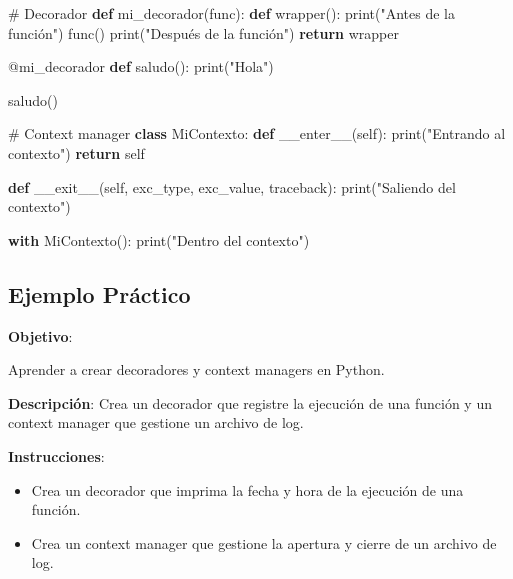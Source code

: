 \documentclass[
  a4paper,
  DIV=11,
  numbers=noendperiod,
  onepage,
  openany]{scrreprt}
\newenvironment{Shaded}{\begin{snugshade}}{\end{snugshade}}
\newcommand{\AttributeTok}[1]{\textcolor[rgb]{0.40,0.45,0.13}{#1}}
\newcommand{\BuiltInTok}[1]{\textcolor[rgb]{0.00,0.23,0.31}{#1}}
\newcommand{\CommentTok}[1]{\textcolor[rgb]{0.37,0.37,0.37}{#1}}
\newcommand{\ControlFlowTok}[1]{\textcolor[rgb]{0.00,0.23,0.31}{\textbf{#1}}}
\newcommand{\FunctionTok}[1]{\textcolor[rgb]{0.28,0.35,0.67}{#1}}
\newcommand{\KeywordTok}[1]{\textcolor[rgb]{0.00,0.23,0.31}{\textbf{#1}}}
\newcommand{\NormalTok}[1]{\textcolor[rgb]{0.00,0.23,0.31}{#1}}
\newcommand{\StringTok}[1]{\textcolor[rgb]{0.13,0.47,0.30}{#1}}
\newcommand{\VariableTok}[1]{\textcolor[rgb]{0.07,0.07,0.07}{#1}}
\begin{document}
\begin{Shaded}
\begin{Highlighting}[]
\CommentTok{\# Decorador}
\KeywordTok{def}\NormalTok{ mi\_decorador(func):}
    \KeywordTok{def}\NormalTok{ wrapper():}
        \BuiltInTok{print}\NormalTok{(}\StringTok{"Antes de la función"}\NormalTok{)}
\NormalTok{        func()}
        \BuiltInTok{print}\NormalTok{(}\StringTok{"Después de la función"}\NormalTok{)}
    \ControlFlowTok{return}\NormalTok{ wrapper}

\AttributeTok{@mi\_decorador}
\KeywordTok{def}\NormalTok{ saludo():}
    \BuiltInTok{print}\NormalTok{(}\StringTok{"Hola"}\NormalTok{)}

\NormalTok{saludo()}

\CommentTok{\# Context manager}
\KeywordTok{class}\NormalTok{ MiContexto:}
    \KeywordTok{def} \FunctionTok{\_\_enter\_\_}\NormalTok{(}\VariableTok{self}\NormalTok{):}
        \BuiltInTok{print}\NormalTok{(}\StringTok{"Entrando al contexto"}\NormalTok{)}
        \ControlFlowTok{return} \VariableTok{self}

    \KeywordTok{def} \FunctionTok{\_\_exit\_\_}\NormalTok{(}\VariableTok{self}\NormalTok{, exc\_type, exc\_value, traceback):}
        \BuiltInTok{print}\NormalTok{(}\StringTok{"Saliendo del contexto"}\NormalTok{)}

\ControlFlowTok{with}\NormalTok{ MiContexto():}
    \BuiltInTok{print}\NormalTok{(}\StringTok{"Dentro del contexto"}\NormalTok{)}
\end{Highlighting}
\end{Shaded}

\subsection{Ejemplo Práctico}\label{ejemplo-pruxe1ctico-6}

\textbf{Objetivo}:

Aprender a crear decoradores y context managers en Python.

\textbf{Descripción}: Crea un decorador que registre la ejecución de una
función y un context manager que gestione un archivo de log.

\textbf{Instrucciones}:

\begin{itemize}
\item
  Crea un decorador que imprima la fecha y hora de la ejecución de una
  función.
\item
  Crea un context manager que gestione la apertura y cierre de un
  archivo de log.
\end{itemize}
\end{document}
